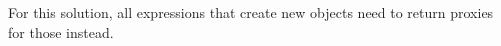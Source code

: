 For this solution, all expressions that create new objects need to return proxies for those instead.




